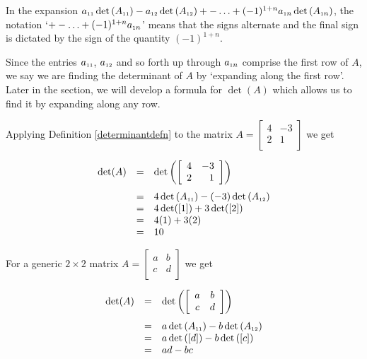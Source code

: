 \documentclass{ximera}
\begin{document}
In the expansion $a_{\mbox{\tiny$11$}} \det\left(A_{\mbox{\tiny$11$}}\right)- a_{\mbox{\tiny$12$}} \det\left(A_{\mbox{\tiny$12$}}\right) + -  \ldots  + (-1)^{1+n} a_{\mbox{\tiny$1$}n} \det\left(A_{\mbox{\tiny$1$}n}\right)$, the notation `$+ -  \ldots  + (-1)^{1+n} a_{\mbox{\tiny$1$}n}$' means that the signs alternate and the final sign is dictated by the sign of the quantity $(-1)^{1+n}$. 

Since the entries $a_{\mbox{\tiny$11$}}$, $a_{\mbox{\tiny$12$}}$ and so forth up through $a_{\mbox{\tiny$1$}n}$ comprise the first row of $A$, we say we are finding the determinant of $A$  by `expanding along the first row'. Later in the section, we will develop a formula for $\det(A)$ which allows us to find it by expanding along any row.

\smallskip

Applying Definition \ref{determinantdefn} to the matrix $A = \left[ \begin{array}{rr} 4 & -3 \\ 2 & 1 \\ \end{array} \right]$ we get

\[ \begin{array}{rcl} 

\det(A) & = & \det \left( \left[ \begin{array}{rr} 4 & -3 \\ 2 & 1 \\ \end{array} \right] \right)\\[13pt]
& = &   4\det\left(A_{\mbox{\tiny$11$}}\right) - (-3)\det\left(A_{\mbox{\tiny$12$}}\right)\\
& = & 4 \det([1]) +3\det([2]) \\
& = & 4(1) + 3(2) \\
& = & 10 \\ \end{array}\]

For a generic $2 \times 2$ matrix $A = \left[ \begin{array}{cc} a & b \\ c & d \\ \end{array} \right]$ we get

\[ \begin{array}{rcl} 

\det(A) & = & \det \left( \left[ \begin{array}{cc}  a & b \\ c & d \\ \end{array} \right] \right)\\[13pt]
 & = &  a \det\left(A_{\mbox{\tiny$11$}}\right) - b \det\left(A_{\mbox{\tiny$12$}}\right) \\
& = &  a \det\left(\left[ d \right]\right) - b \det\left(\left[c \right]\right) \\
& = & ad-bc \end{array}\]
\end{document}

